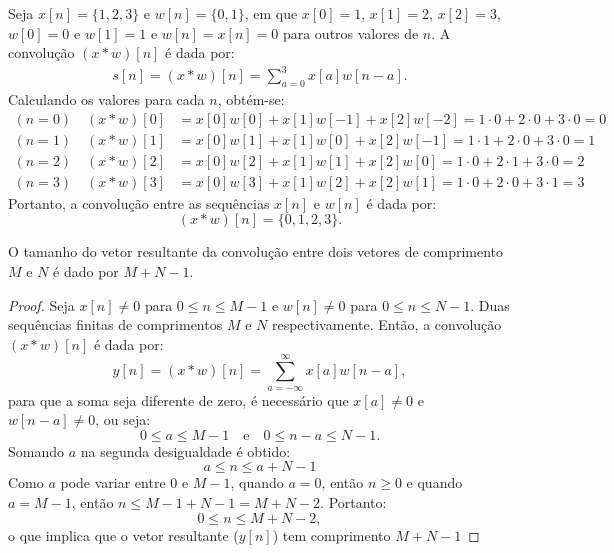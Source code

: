 \begin{exemplo}
    \label{ex:conv_discreta}
    Seja $x[n] = \{1, 2, 3\}$ e $w[n] = \{0, 1\}$, em que $x[0] = 1$, $x[1] = 2$, $x[2] = 3$, $w[0] = 0$ e $w[1] = 1$ e $w[n] = x[n] = 0$ para outros valores de $n$. A convolução $(x*w)[n]$ é dada por:
    \begin{align*}
        s[n] = (x*w)[n] = \sum_{a=0}^{3} x[a]w[n-a].
    \end{align*}
Calculando os valores para cada $n$, obtém-se:
    \begin{align*}
        (n = 0) \quad (x*w)[0] &= x[0]w[0] + x[1]w[-1] + x[2]w[-2] = 1 \cdot 0 + 2 \cdot 0 + 3 \cdot 0 = 0 \\
        (n = 1) \quad (x*w)[1] &= x[0]w[1] + x[1]w[0] + x[2]w[-1] = 1 \cdot 1 + 2 \cdot 0 + 3 \cdot 0 = 1 \\
        (n = 2) \quad (x*w)[2] &= x[0]w[2] + x[1]w[1] + x[2]w[0] = 1 \cdot 0 + 2 \cdot 1 + 3 \cdot 0 = 2 \\
        (n = 3) \quad (x*w)[3] &= x[0]w[3] + x[1]w[2] + x[2]w[1] = 1 \cdot 0 + 2 \cdot 0 + 3 \cdot 1 = 3 
    \end{align*}
Portanto, a convolução entre as sequências $x[n]$ e $w[n]$ é dada por:
\begin{equation}
    (x*w)[n] = \{0, 1, 2, 3\}.
\end{equation}
\end{exemplo}


\begin{proposicao}
    O tamanho do vetor resultante da convolução entre dois vetores de comprimento $M$ e $N$ é dado por $M+N-1$.
\end{proposicao}

\begin{proof}
Seja $x[n] \neq 0$ para $0 \leq n \leq M-1$ e $w[n] \neq 0$ para $0 \leq n \leq N-1$. Duas sequências finitas de comprimentos $M$ e $N$ respectivamente.
Então, a convolução $(x*w)[n]$ é dada por:
$$
y[n] = (x*w)[n] = \sum_{a=-\infty}^{\infty} x[a]w[n-a],
$$
para que a soma seja diferente de zero, é necessário que $x[a] \neq 0$ e $w[n-a] \neq 0$, ou seja:
$$
0 \leq a \leq M-1 \quad \text{e} \quad 0 \leq n-a \leq N-1.
$$
Somando $a$ na segunda desigualdade é obtido:
$$
a \leq n \leq a + N-1
$$
Como $a$ pode variar entre $0$ e $M-1$, quando $a =0$, então $n \geq 0$ e quando $a = M-1$, então $n \leq M-1 + N-1 = M+N-2$. Portanto:
$$
0 \leq n \leq M+N-2,
$$
o que implica que o vetor resultante ($y[n]$) tem comprimento $M+N-1$
\end{proof}


